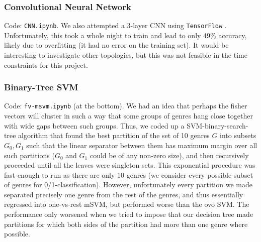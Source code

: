 \documentclass{article}
\begin{document}
\subsubsection{Convolutional Neural Network}\label{cnn}

Code: \texttt{CNN.ipynb}. We also attempted a 3-layer CNN using \texttt{TensorFlow} \cite{tensorflow2015-whitepaper}. Unfortunately, this took a whole night to train and lead to only 49\% accuracy, likely due to overfitting (it had no error on the training set). It would be interesting to investigate other topologies, but this was not feasible in the time constraints for this project.

\subsubsection{Binary-Tree SVM}

Code: \texttt{fv-msvm.ipynb} (at the bottom).
We had an idea that perhaps the fisher vectors will cluster in such
a way that some groups of genres hang close together with wide
gaps between such groups.
Thus, we coded up a SVM-binary-search-tree algorithm that
found the best partition of the set of 10 genres $G$ into 
subsets $G_0, G_1$ such that the linear separator between them
has maximum margin over all such partitions ($G_0$ and $G_1$ could be
of any non-zero size), and then recursively proceeded until
all the leaves were singleton sets.
This exponential procedure was fast enough to run as there are only
10 genres (we consider every possible subset of genres for 0/1-classification).
However, unfortunately every partition we made separated precisely
one genre from the rest of the genres,
and thus essentially regressed into one-vs-rest mSVM, but performed worse than the ovo SVM.
The performance only worsened when we tried to impose
that our decision tree made partitions for which both sides of the 
partition had more than one genre where possible.
\end{document}
